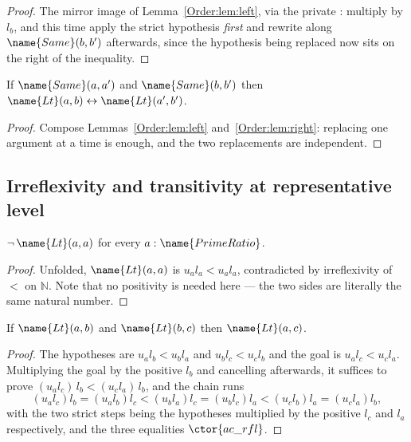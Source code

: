 \begin{proof}
The mirror image of Lemma~\ref{Order:lem:left}, via the private
: multiply by $l_b$, and this time apply the strict
hypothesis \emph{first} and rewrite along $\name{Same}(b,b')$ afterwards,
since the hypothesis being replaced now sits on the right of the inequality.
\end{proof}

\begin{lemma}\label{Order:lem:both}
If $\name{Same}(a,a')$ and $\name{Same}(b,b')$ then
$\name{Lt}(a,b) \leftrightarrow \name{Lt}(a',b')$.
\end{lemma}

\begin{proof}
Compose Lemmas~\ref{Order:lem:left} and~\ref{Order:lem:right}: replacing one
argument at a time is enough, and the two replacements are independent.
\end{proof}

\subsection{Irreflexivity and transitivity at representative level}

\begin{lemma}\label{Order:lem:irrefl-rep}
$\neg\, \name{Lt}(a,a)$ for every $a : \name{PrimeRatio}$.
\end{lemma}

\begin{proof}
Unfolded, $\name{Lt}(a,a)$ is $u_a l_a < u_a l_a$, contradicted by
irreflexivity of $<$ on $\mathbb{N}$.  Note that no positivity is needed
here --- the two sides are literally the same natural number.
\end{proof}

\begin{lemma}\label{Order:lem:trans-rep}
If $\name{Lt}(a,b)$ and $\name{Lt}(b,c)$ then $\name{Lt}(a,c)$.
\end{lemma}

\begin{proof}
The hypotheses are $u_a l_b < u_b l_a$ and $u_b l_c < u_c l_b$ and the goal is
$u_a l_c < u_c l_a$.  Multiplying the goal by the positive $l_b$ and cancelling
afterwards, it suffices to prove
$(u_a l_c)\,l_b < (u_c l_a)\,l_b$, and the chain runs
\[
  (u_a l_c) l_b = (u_a l_b) l_c
    < (u_b l_a) l_c = (u_b l_c) l_a
    < (u_c l_b) l_a = (u_c l_a) l_b,
\]
with the two strict steps being the hypotheses multiplied by the positive
$l_c$ and $l_a$ respectively, and the three equalities $\ctor{ac\_rfl}$.
\end{proof}

